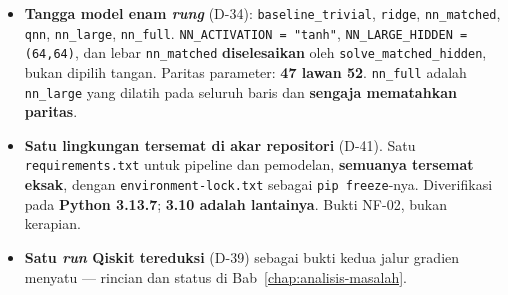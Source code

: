 \begin{itemize}
          model tak terlatih memprediksi laju dasar; \texttt{calibrate\_output()}
          menskalakan ulang kepala agar sebaran marginalnya cocok. Tanpa bias,
          model pada target 5,79\% positif menghabiskan seluruh anggarannya
          menyeret \textit{intercept} dari 0 ke $-2,79$.
    \item \textbf{Tangga model enam \textit{rung}} (D-34):
          \texttt{baseline\_trivial}, \texttt{ridge}, \texttt{nn\_matched},
          \texttt{qnn}, \texttt{nn\_large}, \texttt{nn\_full}.
          \texttt{NN\_ACTIVATION = "tanh"}, \texttt{NN\_LARGE\_HIDDEN = (64,64)},
          dan lebar \texttt{nn\_matched} \textbf{diselesaikan} oleh
          \texttt{solve\_matched\_hidden}, bukan dipilih tangan. Paritas
          parameter: \textbf{47 lawan 52}. \texttt{nn\_full} adalah
          \texttt{nn\_large} yang dilatih pada seluruh baris dan
          \textbf{sengaja mematahkan paritas}.
    \item \textbf{Satu lingkungan tersemat di akar repositori} (D-41). Satu
          \texttt{requirements.txt} untuk pipeline dan pemodelan,
          \textbf{semuanya tersemat eksak}, dengan
          \texttt{environment-lock.txt} sebagai \texttt{pip freeze}-nya.
          Diverifikasi pada \textbf{Python 3.13.7}; \textbf{3.10 adalah
          lantainya}. Bukti NF-02, bukan kerapian.
    \item \textbf{Satu \textit{run} Qiskit tereduksi} (D-39) sebagai bukti kedua
          jalur gradien menyatu --- rincian dan status di
          Bab~\ref{chap:analisis-masalah}.
\end{itemize}
